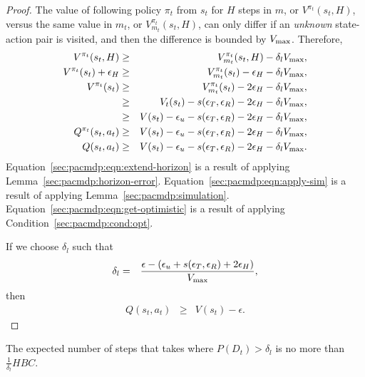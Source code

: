 \begin{proof}
The value of following policy $\pi_t$ from $s_t$ for $H$ steps in $m$, or $V^{\pi_t}(s_t,H)$, versus the same value in $m_t$, or $V^{\pi_t}_{m_t}(s_t,H)$, can only differ if an \emph{unknown} state-action pair is visited, and then the difference is bounded by $V_{\rm max}$. Therefore,
\begin{eqnarray}
V^{\pi_t}(s_t,H) &\geq& V^{\pi_t}_{m_t}(s_t,H) - \delta_lV_{\rm max},\\
\label{sec:pacmdp:eqn:extend-horizon}
V^{\pi_t}(s_t) + \epsilon_H  &\geq& V^{\pi_t}_{m_t}(s_t) - \epsilon_H - \delta_lV_{\rm max},\\
V^{\pi_t}(s_t) &\geq& V^{\pi_t}_{m_t}(s_t) - 2\epsilon_H - \delta_lV_{\rm max},\\
\label{sec:pacmdp:eqn:apply-sim}
 &\geq& V_t(s_t) - s(\epsilon_T,\epsilon_R) -2 \epsilon_H - \delta_lV_{\rm max},\\
\label{sec:pacmdp:eqn:get-optimistic}
 &\geq& V(s_t) - \epsilon_u - s(\epsilon_T,\epsilon_R) -2 \epsilon_H - \delta_lV_{\rm max},\\
Q^{\pi_t}(s_t,a_t) &\geq& V(s_t) - \epsilon_u - s(\epsilon_T,\epsilon_R) -2 \epsilon_H - \delta_lV_{\rm max},\\
Q(s_t,a_t) &\geq& V(s_t) - \epsilon_u - s(\epsilon_T,\epsilon_R) -2 \epsilon_H - \delta_lV_{\rm max}.
\end{eqnarray}
Equation~\ref{sec:pacmdp:eqn:extend-horizon} is a result of applying Lemma~\ref{sec:pacmdp:horizon-error}.
Equation~\ref{sec:pacmdp:eqn:apply-sim} is a result of applying Lemma~\ref{sec:pacmdp:simulation}.
Equation~\ref{sec:pacmdp:eqn:get-optimistic} is a result of applying Condition~\ref{sec:pacmdp:cond:opt}.


If we choose $\delta_l$ such that
\begin{eqnarray}
\delta_l &=& \frac {\epsilon - (\epsilon_u + s(\epsilon_T,\epsilon_R) +2 \epsilon_H)} {V_{\rm max}},
\end{eqnarray}
then 
\begin{eqnarray}
Q(s_t,a_t) &\geq& V(s_t) - \epsilon.
\end{eqnarray}

\end{proof}

\begin{lemma}
\label{sec:pacmdp:lemma:bad-steps}
The expected number of steps that \A takes where $P(D_t) > \delta_l$ is no more than $\frac 1 {\delta_l} H B C$.
\end{lemma}

